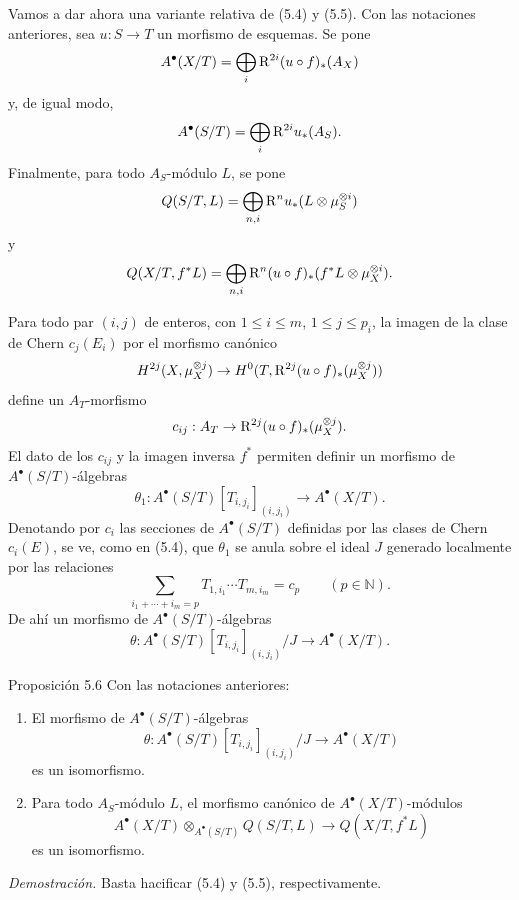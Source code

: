 Vamos a dar ahora una variante relativa de (5.4) y (5.5). Con las notaciones anteriores, sea $u:S\to T$ un morfismo de esquemas. Se pone
\[
A^\bullet(X/T)=\bigoplus_i \mathrm{R}^{2i}(u\circ f)_*(A_X)
\]
y, de igual modo,
\[
A^\bullet(S/T)=\bigoplus_i \mathrm{R}^{2i}u_*(A_S).
\]
Finalmente, para todo $A_S$-módulo $L$, se pone
\[
Q(S/T,L)=\bigoplus_{n,i}\mathrm{R}^n u_*(L\otimes\mu_S^{\otimes i})
\]
y
\[
Q(X/T,f^*L)=\bigoplus_{n,i}\mathrm{R}^n(u\circ f)_*(f^*L\otimes\mu_X^{\otimes i}).
\]

Para todo par $(i,j)$ de enteros, con $1\le i\le m$, $1\le j\le p_i$, la imagen de la clase de Chern $c_j(E_i)$ por el morfismo canónico
\[
H^{2j}(X,\mu_X^{\otimes j})
\to H^0(T,\mathrm{R}^{2j}(u\circ f)_*(\mu_X^{\otimes j}))
\]
define un $A_T$-morfismo
\[
c_{ij}:A_T\to \mathrm{R}^{2j}(u\circ f)_*(\mu_X^{\otimes j}).
\]
El dato de los $c_{ij}$ y la imagen inversa $f^*$ permiten definir un morfismo de $A^\bullet(S/T)$-álgebras
\[
\theta_1:A^\bullet(S/T)[T_{i,j_i}]_{(i,j_i)}\to A^\bullet(X/T).
\]
Denotando por $c_i$ las secciones de $A^\bullet(S/T)$ definidas por las clases de Chern $c_i(E)$, se ve, como en (5.4), que $\theta_1$ se anula sobre el ideal $J$ generado localmente por las relaciones
\[
\sum_{i_1+\cdots+i_m=p}T_{1,i_1}\cdots T_{m,i_m}=c_p\qquad(p\in\mathbb N).
\]
De ahí un morfismo de $A^\bullet(S/T)$-álgebras
\[
\theta:A^\bullet(S/T)[T_{i,j_i}]_{(i,j_i)}/J\to A^\bullet(X/T).
\]

\begin{statement}{Proposición 5.6}
Con las notaciones anteriores:
\begin{enumerate}[label=\alph*)]
\item El morfismo de $A^\bullet(S/T)$-álgebras
\[
\theta:A^\bullet(S/T)[T_{i,j_i}]_{(i,j_i)}/J\to A^\bullet(X/T)
\]
es un isomorfismo.
\item Para todo $A_S$-módulo $L$, el morfismo canónico de $A^\bullet(X/T)$-módulos
\[
A^\bullet(X/T)\otimes_{A^\bullet(S/T)}Q(S/T,L)\to Q(X/T,f^*L)
\]
es un isomorfismo.
\end{enumerate}
\end{statement}

\emph{Demostración.} Basta hacificar (5.4) y (5.5), respectivamente.
